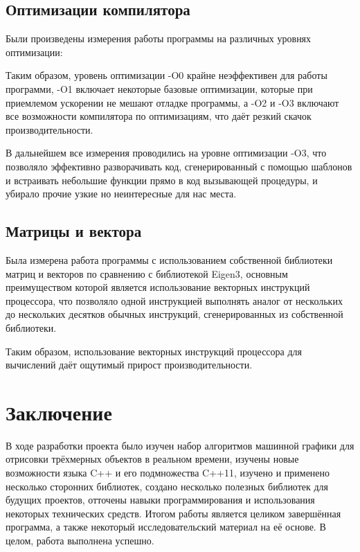 \documentclass[a4paper,12pt]{report}
\begin{document}
\subsection{Оптимизации компилятора}
Были произведены измерения работы программы на различных уровнях оптимизации:


Таким образом, уровень оптимизации -O0 крайне неэффективен для работы программи, -O1 включает некоторые базовые оптимизации, которые при приемлемом ускорении не мешают отладке программы, а -O2 и -O3 включают все возможности компилятора по оптимизациям, что даёт резкий скачок производительности.

В дальнейшем все измерения проводились на уровне оптимизации -O3, что позволяло эффективно разворачивать код, сгенерированный с помощью шаблонов и встраивать небольшие функции прямо в код вызывающей процедуры, и убирало прочие узкие но неинтересные для нас места.

\subsection{Матрицы и вектора}
Была измерена работа программы с использованием собственной библиотеки матриц и векторов по сравнению с библиотекой Eigen3, основным преимуществом которой является использование векторных инструкций процессора, что позволяло одной инструкцией выполнять аналог от нескольких до нескольких десятков обычных инструкций, сгенерированных из собственной библиотеки.


Таким образом, использование векторных инструкций процессора для вычислений даёт ощутимый прирост производительности.

\section{Заключение}
В ходе разработки проекта было изучен набор алгоритмов машинной графики для отрисовки трёхмерных объектов в реальном времени, изучены новые возможности языка C++ и его подмножества C++11, изучено и применено несколько сторонних библиотек, создано несколько полезных библиотек для будущих проектов, отточены навыки программирования и использования некоторых технических средств. Итогом работы является целиком завершённая программа, а также некоторый исследовательский материал на её основе. В целом, работа выполнена успешно.
\end{document}
